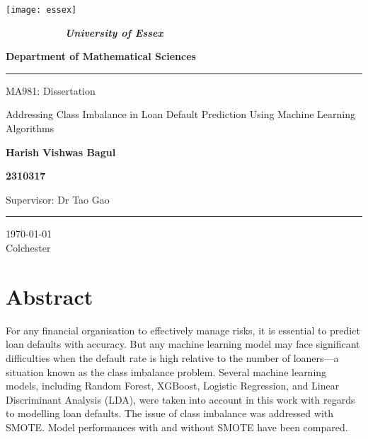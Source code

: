 \documentclass[12pt, a4paper,oneside]{book}
\numberwithin{equation}{section}
\begin{document}
\thispagestyle{empty}

\begin{minipage}{0.2\textwidth}
\centerline{\texttt{[image: essex]} }
\end{minipage}
\begin{minipage}{0.8\textwidth}

$ \qquad \qquad \qquad ${\LARGE \bf \sl University of Essex}

{\LARGE \bf Department of Mathematical Sciences}

\end{minipage}

\begin{center}

\noindent\textcolor{myred}{\rule{\linewidth}{4.8pt}}

\vspace{1cm}

{\LARGE \sc  MA981: Dissertation}

\vspace{1.5cm}

{\Huge{\color{myblue}  Addressing Class Imbalance in Loan Default Prediction Using Machine Learning Algorithms}}

\vspace{1.5cm}

{\Large \bf Harish Vishwas Bagul}

{\Large \bf 2310317}



\vspace{2.0cm}


\vspace{1.5cm}

{\Large {Supervisor: Dr Tao Gao} }

\vspace{.25cm}

\noindent\textcolor{myred}{\rule{\linewidth}{4.8pt}}

\vspace{1cm}
{\Large \today }\\[4pt]
{\Large Colchester}
\end{center}



\setlength{\parskip}{0.5em}
\setlength{\parindent}{0pt}

\newpage

\chapter*{Abstract} 
For any financial organisation to effectively manage risks, it is essential to predict loan defaults with accuracy. But any machine learning model may face significant difficulties when the default rate is high relative to the number of loaners—a situation known as the class imbalance problem. Several machine learning models, including Random Forest, XGBoost, Logistic Regression,  and Linear Discriminant Analysis (LDA), were taken into account in this work with regards to modelling loan defaults. The issue of class imbalance was addressed with SMOTE. Model performances with and without SMOTE have been compared.
\end{document}
